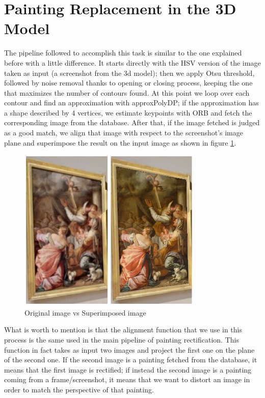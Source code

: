 \documentclass[conference]{IEEEtran}
\begin{document}
\section{Painting Replacement in the 3D Model}
The pipeline followed to accomplish this task is similar to the one explained before with a little difference. It starts directly with the HSV version of the image taken as input (a screenshot from the 3d model); then we apply Otsu threshold, followed by noise removal thanks to opening or closing process, keeping the one that maximizes the number of contours found. At this point we loop over each contour and find an approximation with approxPolyDP; if the approximation has a shape described by 4 vertices, we estimate keypoints with ORB and fetch the corresponding image from the database. After that, if the image fetched is judged as a good match, we align that image with respect to the screenshot’s image plane and superimpose the result on the input image as shown in figure \ref{fig_3d_model}.

\begin{figure}[htbp]
\centerline{\includegraphics[width=0.8\columnwidth]{../3DModel/collage_06.jpg}}
\caption{Original image vs Superimposed image}
\label{fig_3d_model}
\end{figure}

What is worth to mention is that the alignment function that we use in this process is the same used in the main pipeline of painting rectification. This function in fact takes as input two images and project the first one on the plane of the second one. If the second image is a painting fetched from the database, it means that the first image is rectified; if instead the second image is a painting coming from a frame/screenshot, it means that we want to distort an image in order to match the perspective of that painting.\\
\end{document}
